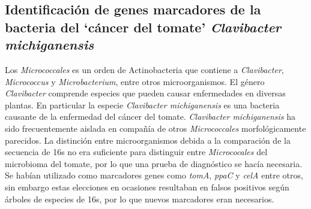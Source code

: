 \documentclass[12pt,twoside]{reedthesis}
\begin{document}
  \subsection{\texorpdfstring{Identificación de genes marcadores de la
  bacteria del `cáncer del tomate' \emph{Clavibacter
  michiganensis}}{Identificación de genes marcadores de la bacteria del cáncer del tomate Clavibacter michiganensis}}\label{identificacion-de-genes-marcadores-de-la-bacteria-del-cancer-del-tomate-clavibacter-michiganensis}
  
  Los \emph{Micrococcales} es un orden de Actinobacteria que contiene a
  \emph{Clavibacter}, \emph{Micrococcus} y \emph{Microbacterium}, entre
  otros microorganismos. El género \emph{Clavibacter} comprende especies
  que pueden causar enfermedades en diversas plantas. En particular la
  especie \emph{Clavibacter michiganensis} es una bacteria causante de la
  enfermedad del cáncer del tomate. \emph{Clavibacter michiganensis} ha
  sido frecuentemente aislada en compañía de otros \emph{Micrococcales}
  morfológicamente parecidos. La distinción entre microorganismos debida a
  la comparación de la secuencia de 16s no era suficiente para distinguir
  entre \emph{Micrococales} del microbioma del tomate, por lo que una
  prueba de diagnóstico se hacía necesaria. Se habían utilizado como
  marcadores genes como \emph{tomA}, \emph{ppaC} y \emph{celA} entre
  otros, sin embargo estas elecciones en ocasiones resultaban en falsos
  positivos según árboles de especies de 16s, por lo que nuevos marcadores
  eran necesarios.
  
\end{document}
